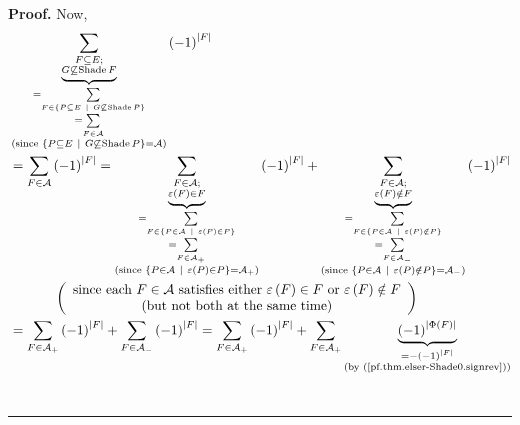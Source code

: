 \documentclass[numbers=enddot,12pt,final,onecolumn]{scrartcl}%
\theoremstyle{definition}
\newenvironment{proof}[1][Proof]{\noindent\textbf{#1.} }{\ \rule{0.5em}{0.5em}}
\let\sumnonlimits\sum
\renewcommand{\sum}{\sumnonlimits\limits}
\newenvironment{verlong}{}{}
\begin{document}
\begin{verlong}
\begin{proof}
Now,
\begin{align*}
&  \underbrace{\sum_{\substack{F\subseteq E;\\G\not \subseteq
\operatorname*{Shade}F}}}_{\substack{=\sum_{F\in\left\{  P\subseteq
E\ \mid\ G\not \subseteq \operatorname*{Shade}P\right\}  }\\=\sum
_{F\in\mathcal{A}}\\\text{(since }\left\{  P\subseteq E\ \mid
\ G\not \subseteq \operatorname*{Shade}P\right\}  =\mathcal{A}\text{)}%
}}\left(  -1\right)  ^{\left\vert F\right\vert }\\
&  =\sum_{F\in\mathcal{A}}\left(  -1\right)  ^{\left\vert F\right\vert
}=\underbrace{\sum_{\substack{F\in\mathcal{A};\\\varepsilon\left(  F\right)
\in F}}}_{\substack{=\sum_{F\in\left\{  P\in\mathcal{A}\ \mid\ \varepsilon
\left(  P\right)  \in P\right\}  }\\=\sum_{F\in\mathcal{A}_{+}}\\\text{(since
}\left\{  P\in\mathcal{A}\ \mid\ \varepsilon\left(  P\right)  \in P\right\}
=\mathcal{A}_{+}\text{)}}}\left(  -1\right)  ^{\left\vert F\right\vert
}+\underbrace{\sum_{\substack{F\in\mathcal{A};\\\varepsilon\left(  F\right)
\notin F}}}_{\substack{=\sum_{F\in\left\{  P\in\mathcal{A}\ \mid
\ \varepsilon\left(  P\right)  \notin P\right\}  }\\=\sum_{F\in\mathcal{A}%
_{-}}\\\text{(since }\left\{  P\in\mathcal{A}\ \mid\ \varepsilon\left(
P\right)  \notin P\right\}  =\mathcal{A}_{-}\text{)}}}\left(  -1\right)
^{\left\vert F\right\vert }\\
&  \ \ \ \ \ \ \ \ \ \ \left(
\begin{array}
[c]{c}%
\text{since each }F\in\mathcal{A}\text{ satisfies either }\varepsilon\left(
F\right)  \in F\text{ or }\varepsilon\left(  F\right)  \notin F\\
\text{(but not both at the same time)}%
\end{array}
\right) \\
&  =\sum_{F\in\mathcal{A}_{+}}\left(  -1\right)  ^{\left\vert F\right\vert
}+\sum_{F\in\mathcal{A}_{-}}\left(  -1\right)  ^{\left\vert F\right\vert
}=\sum_{F\in\mathcal{A}_{+}}\left(  -1\right)  ^{\left\vert F\right\vert
}+\sum_{F\in\mathcal{A}_{+}}\underbrace{\left(  -1\right)  ^{\left\vert
\Phi\left(  F\right)  \right\vert }}_{\substack{=-\left(  -1\right)
^{\left\vert F\right\vert }\\\text{(by (\ref{pf.thm.elser-Shade0.signrev}))}%
}}
\end{align*}
\end{proof}
\end{verlong}
\end{document}
